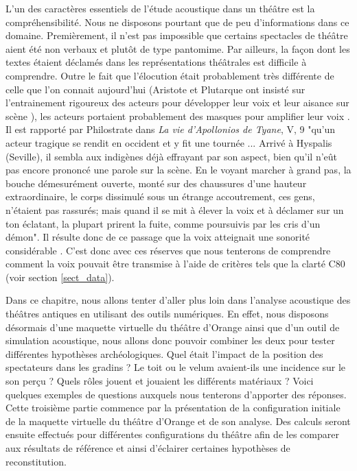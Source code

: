 L'un des caractères essentiels de l'étude acoustique dans un théâtre est la compréhensibilité. Nous ne disposons pourtant que de peu d'informations dans ce domaine. Premièrement, il n'est pas impossible que certains spectacles de théâtre aient été non verbaux et plutôt de type pantomime. Par ailleurs, la façon dont les textes étaient déclamés dans les représentations théâtrales est difficile à comprendre. Outre le fait que l'élocution était probablement très différente de celle que l'on connait aujourd'hui (Aristote \cite[Chap IV - XIV]{aristote} et Plutarque ont insisté sur l'entrainement rigoureux des acteurs pour développer leur voix et leur aisance sur scène \cite[p.39]{canac}), les acteurs portaient probablement des masques pour amplifier leur voix \cite[p.362]{arnaud}. Il est rapporté par Philostrate dans \textit{La vie d'Apollonios de Tyane}, V, 9 "qu'un acteur tragique se rendit en occident et y fit une tournée ... Arrivé à Hyspalis (Seville), il sembla aux indigènes déjà effrayant par son aspect, bien qu'il n'eût pas encore prononcé une parole sur la scène. En le voyant marcher à grand pas, la bouche démesurément ouverte, monté sur des chaussures d'une hauteur extraordinaire, le corps dissimulé sous un étrange accoutrement, ces gens, n'étaient pas rassurés; mais quand il se mit à élever la voix et à déclamer sur un ton éclatant, la plupart prirent la fuite, comme poursuivis par les cris d'un démon". Il résulte donc de ce passage que la voix atteignait une sonorité considérable \cite[p.43]{formige}. C'est donc avec ces réserves que nous tenterons de comprendre comment la voix pouvait être transmise à l'aide de critères tels que la clarté \gls{C80} (voir section \ref{sect_data}).

Dans ce chapitre, nous allons tenter d'aller plus loin dans l'analyse acoustique des théâtres antiques en utilisant des outils numériques. En effet, nous disposons désormais d'une maquette virtuelle du théâtre d'Orange ainsi que d'un outil de simulation acoustique, nous allons donc pouvoir combiner les deux pour tester différentes hypothèses archéologiques. Quel était l'impact de la position des spectateurs dans les gradins ? Le toit ou le \gls{velum} avaient-ils une incidence sur le son perçu ? Quels rôles jouent et jouaient les différents matériaux ? Voici quelques exemples de questions auxquels nous tenterons d'apporter des réponses. Cette troisième partie commence par la présentation de la configuration initiale de la maquette virtuelle du théâtre d'Orange et de son analyse. Des calculs seront ensuite effectués pour différentes configurations du théâtre afin de les comparer aux résultats de référence et ainsi d'éclairer certaines hypothèses de reconstitution. %
	

